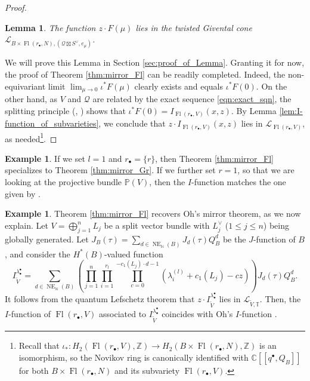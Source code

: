 \documentclass[a4paper,12pt]{amsart}
\numberwithin{equation}{section}
\newtheorem{lemma}[theorem]{Lemma}
\theoremstyle{definition}
\newtheorem{example}[theorem]{Example}
\newcommand{\C}{\mathbb{C}}
\newcommand{\Z}{\mathbb{Z}}
\newcommand{\N}{\mathbb{N}}
\newcommand{\T}{\mathbb{T}}
\newcommand{\cL}{\mathcal{L}}
\newcommand{\NE}{\operatorname{NE}_{\N}}
\newcommand{\Fl}{\operatorname{Fl}}
\begin{document}
\begin{proof}
\begin{lemma}\label{lem:twisted_function}
    The function $z\cdot F(\mu)$ lies in the twisted Givental cone $\cL_{B\times\Fl(r_\bullet,N),(\mathcal{Q}\boxtimes S^\vee,e_\mu)}$.
\end{lemma}

We will prove this Lemma in Section \ref{sec:proof_of_Lemma}. Granting it for now, the proof of Theorem \ref{thm:mirror_Fl} can be readily completed. Indeed, the non-equivariant limit $\lim_{\mu\to0} \iota^*F(\mu)$ clearly exists and equals $\iota^*F(0)$. On the other hand, as $V$ and $\mathcal{Q}$ are related by the exact sequence \eqref{eqn:exact_sqn}, the splitting principle (\cite[$\S21$]{BT:differential}, \cite[Remark 3.2.3]{Fulton}) shows that $\iota^*F(0)=I_{\Fl(r_\bullet,V)}(x,z)$.  By Lemma \ref{lem:I-function_of_subvarieties}, we conclude that $z\cdot I_{\Fl(r_\bullet,V)}(x,z)$ lies in $\cL_{\Fl(r_\bullet,V)}$, as needed\footnote{Recall that $\iota_*:H_2(\Fl(r_\bullet,V),\Z)\to H_2(B\times\Fl(r_\bullet,N),\Z)$ is an isomorphism, so the Novikov ring is canonically identified with $\C[\![q^\bullet,Q_B]\!]$ for both $B\times\Fl(r_\bullet,N)$ and its subvariety $\Fl(r_\bullet,V)$.}.
     
\end{proof}


\begin{example}\label{ex:IK}
    If we set $l=1$ and $r_\bullet=\{r\}$, then Theorem \ref{thm:mirror_Fl} specializes to Theorem \ref{thm:mirror_Gr}.
    If we further set $r=1$, so that we are looking at the projective bundle $\mathbb{P}(V)$, then the $I$-function matches the one given by \cite[Theorem 3.3]{IK:quantum}.
\end{example}


\begin{example}\label{ex:Oh}
    Theorem \ref{thm:mirror_Fl} recovers Oh's mirror theorem, as we now explain.
    Let $V=\bigoplus_{j=1}^nL_j$ be a split vector bundle with $L_j^\vee$ ($1\leq j\leq n$) being globally generated.
    Let $J_B(\tau)=\sum_{d\in\NE(B)} J_d(\tau) Q_B^d$ be the $J$-function of $B$, and consider the $H^*(B)$-valued function
    \[
    I_{\widetilde{V}}^{\lambda_\bullet^\bullet} = \sum_{d\in\NE(B)} \left( \prod_{j=1}^n \prod_{i=1}^{r_l} \prod_{c=0}^{-c_1(L_j)\cdot d-1} (\lambda_i^{(l)} + c_1(L_j) - cz) \right) J_d(\tau) Q_B^d.
    \]
    It follows from the quantum Lefschetz theorem \cite{CG:quantum} that $z\cdot I_{\widetilde{V}}^{\lambda_\bullet^\bullet}$ lies in $\cL_{\widetilde{V},\T}$.
    Then, the $I$-function of $\Fl(r_\bullet,V)$ associated to $I_{\widetilde{V}}^{\lambda_\bullet^\bullet}$ coincides with Oh's $I$-function \cite{Oh:split_flag_bundle}.
\end{example}
\end{document}
